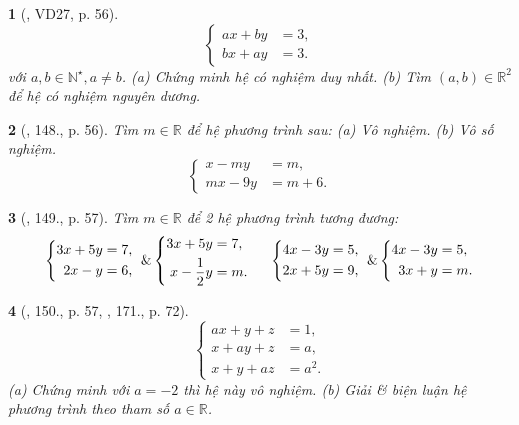 \documentclass{article}
\newtheorem{baitoan}{}
\begin{document}
\begin{baitoan}[\cite{Tuyen_Toan_9_old}, VD27, p. 56]
	\begin{equation*}
		\left\{\begin{split}
			ax + by &= 3,\\
			bx + ay &= 3.
		\end{split}\right.
	\end{equation*}
	với $a,b\in\mathbb{N}^\star,a\ne b$. (a) Chứng minh hệ có nghiệm duy nhất. (b) Tìm $(a,b)\in\mathbb{R}^2$ để hệ có nghiệm nguyên dương.
\end{baitoan}

\begin{baitoan}[\cite{Tuyen_Toan_9_old}, 148., p. 56]
	Tìm $m\in\mathbb{R}$ để hệ phương trình sau: (a) Vô nghiệm. (b) Vô số nghiệm.
	\begin{equation*}
		\left\{\begin{split}
			x - my &= m,\\
			mx - 9y &= m + 6.
		\end{split}\right.
	\end{equation*}	
\end{baitoan}

\begin{baitoan}[\cite{Tuyen_Toan_9_old}, 149., p. 57]
	Tìm $m\in\mathbb{R}$ để 2 hệ phương trình tương đương:
	\begin{equation*}
		\left\{\begin{split}
			3x + 5y &= 7,\\
			2x - y &= 6,
		\end{split}\right.\ \&
		\left\{\begin{split}
			3x + 5y &= 7,\\
			x - \frac{1}{2}y &= m.
		\end{split}\right.\hspace{5mm} \left\{\begin{split}
			4x - 3y &= 5,\\
			2x + 5y &= 9,
		\end{split}\right.\ \&
		\left\{\begin{split}
			4x - 3y &= 5,\\
			3x + y &= m.
		\end{split}\right.
	\end{equation*}
\end{baitoan}

\begin{baitoan}[\cite{Tuyen_Toan_9_old}, 150., p. 57, \cite{Dong_23_1001_toan_I}, 171., p. 72]
	\begin{equation*}
		\left\{\begin{split}
			ax + y + z &= 1,\\
			x + ay + z &= a,\\
			x + y + az &= a^2.
		\end{split}\right.
	\end{equation*}
	(a) Chứng minh với $a = -2$ thì hệ này vô nghiệm. (b) Giải \& biện luận hệ phương trình theo tham số $a\in\mathbb{R}$.
\end{baitoan}
\end{document}
